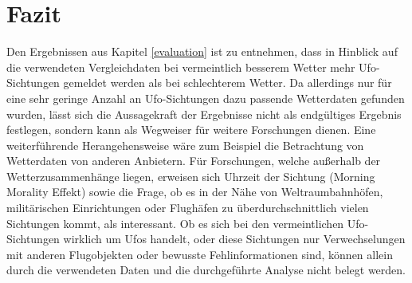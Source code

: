 \section{Fazit} \label{fazit}

Den Ergebnissen aus Kapitel \ref{evaluation} ist zu entnehmen, dass in Hinblick auf die verwendeten Vergleichdaten bei vermeintlich besserem Wetter mehr Ufo-Sichtungen gemeldet werden als bei schlechterem Wetter. Da allerdings nur für eine sehr geringe Anzahl an Ufo-Sichtungen dazu passende Wetterdaten gefunden wurden, lässt sich die Aussagekraft der Ergebnisse nicht als endgültiges Ergebnis festlegen, sondern kann als Wegweiser für weitere Forschungen dienen. Eine weiterführende Herangehensweise wäre zum Beispiel die Betrachtung von Wetterdaten von anderen Anbietern. Für Forschungen, welche außerhalb der Wetterzusammenhänge liegen, erweisen sich Uhrzeit der Sichtung (Morning Morality Effekt) sowie die Frage, ob es in der Nähe von Weltraumbahnhöfen, militärischen Einrichtungen oder Flughäfen zu überdurchschnittlich vielen Sichtungen kommt, als interessant. Ob es sich bei den vermeintlichen Ufo-Sichtungen wirklich um Ufos handelt, oder diese Sichtungen nur Verwechselungen mit anderen Flugobjekten oder bewusste Fehlinformationen sind, können allein durch die verwendeten Daten und die durchgeführte Analyse nicht belegt werden.